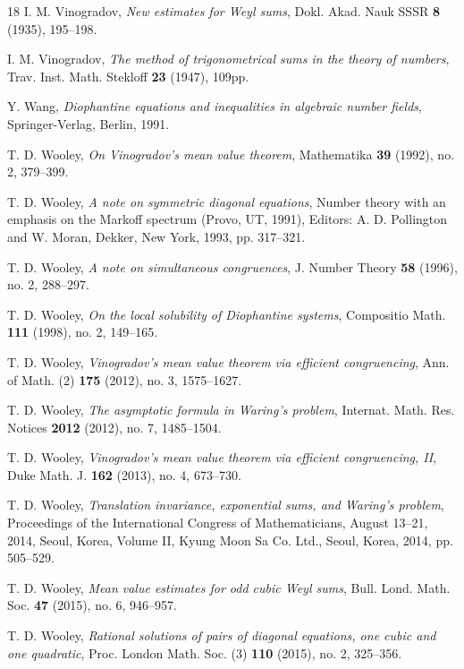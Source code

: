 \documentclass[12pt,reqno]{amsart}
\theoremstyle{definition}
\theoremstyle{remark}
\numberwithin{equation}{section}
\begin{document}
\begin{thebibliography}{18}
I. M. Vinogradov, \emph{New estimates for Weyl sums}, Dokl. Akad. Nauk SSSR \textbf{8} 
(1935), 195--198.

I. M. Vinogradov, \emph{The method of trigonometrical sums in the theory of numbers}, 
Trav. Inst. Math. Stekloff \textbf{23} (1947), 109pp.

Y. Wang, \emph{Diophantine equations and inequalities in algebraic number fields}, 
Springer-Verlag, Berlin, 1991.

T. D. Wooley, \emph{On Vinogradov's mean value theorem}, Mathematika \textbf{39} 
(1992), no. 2, 379--399.

T. D. Wooley, \emph{A note on symmetric diagonal equations}, Number theory with an
emphasis on the Markoff spectrum (Provo, UT, 1991), Editors: A. D. Pollington and W.
Moran, Dekker, New York, 1993, pp. 317--321.

T. D. Wooley, \emph{A note on simultaneous congruences}, J. Number Theory \textbf{58} 
(1996), no. 2, 288--297.

T. D. Wooley, \emph{On the local solubility of Diophantine systems}, Compositio Math. 
\textbf{111} (1998), no. 2, 149--165.

T. D. Wooley, \emph{Vinogradov's mean value theorem via efficient congruencing}, Ann. 
of Math. (2) \textbf{175} (2012), no. 3, 1575--1627.

T. D. Wooley, \emph{The asymptotic formula in Waring's problem}, Internat. Math. Res. 
Notices \textbf{2012} (2012), no. 7, 1485--1504.

T. D. Wooley, \emph{Vinogradov's mean value theorem via efficient congruencing, II}, 
Duke Math. J. \textbf{162} (2013), no. 4, 673--730.

T. D. Wooley, \emph{Translation invariance, exponential sums, and Waring's problem}, 
Proceedings of the International Congress of Mathematicians, August 13--21, 2014, Seoul, 
Korea, Volume II, Kyung Moon Sa Co. Ltd., Seoul, Korea, 2014, pp. 505--529.

T. D. Wooley, \emph{Mean value estimates for odd cubic Weyl sums}, Bull. Lond. Math. Soc. 
\textbf{47} (2015), no. 6, 946--957.

T. D. Wooley, \emph{Rational solutions of pairs of diagonal equations, one cubic and one 
quadratic}, Proc. London Math. Soc. (3) \textbf{110} (2015), no. 2, 325--356.


\end{thebibliography}
\end{document}
